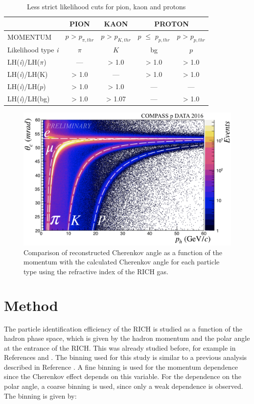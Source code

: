 \begin{table}[!h]
  \caption{Less strict likelihood cuts for pion, kaon and protons}
  \label{tab:LHlessstrict}
  \centering
  \begin{tabular}{lcccc}
    \hline
     & PION & KAON & \multicolumn{2}{c}{PROTON} \\
    \hline
    MOMENTUM & $p$ > $p_{\pi,thr}$ & $p$ > $p_{K,thr}$ & $p$ $\leq$ $p_{p,thr}$ & $p$ > $p_{p,thr}$ \\
    Likelihood type \textit{i} & $\pi$ & $K$ & bg & $p$ \\
    LH(\textit{i})/LH($\pi$) & --- & > 1.0 & > 1.0 & > 1.0 \\
    LH(\textit{i})/LH(K) & > 1.0 & --- & > 1.0 & > 1.0 \\
    LH(\textit{i})/LH($p$) & > 1.0 & > 1.0 & --- & --- \\
    LH(\textit{i})/LH(bg) & > 1.0 & > 1.07 & --- & > 1.0 \\
    \hline
  \end{tabular}
\end{table}

\begin{figure}[!h]
  \centering
	\includegraphics[scale=0.45]{./gfx/RICHIndices.png}
	\caption{Comparison of reconstructed Cherenkov angle as a function of the momentum with the calculated Cherenkov angle for each particle type using the refractive index of the RICH gas.}
	\label{pic:RefIndex}
\end{figure}

\section{Method}

The particle identification efficiency of the RICH is studied as a function of the hadron phase space, which is given by the hadron momentum and the polar angle at the entrance of the RICH. This was already studied before, for example in References \cite{} and \cite{}. The binning used for this study is similar to a previous analysis described in Reference \cite{}. A fine binning is used for the momentum dependence since the Cherenkov effect depends on this variable. For the dependence on the polar angle, a coarse binning is used, since only a weak dependence is observed. The binning is given by:

